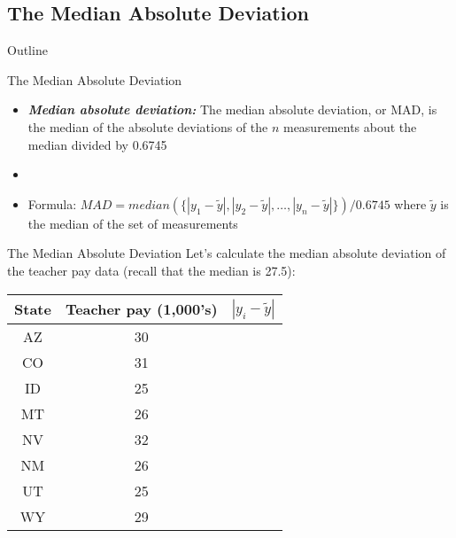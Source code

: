 \documentclass[xcolor=dvipsnames]{beamer}
\begin{document}
\subsection{The Median Absolute Deviation}
\begin{frame}{Outline}
	\tableofcontents[currentsection,subsectionstyle=show/shaded/hide]
\end{frame}

\begin{frame}{The Median Absolute Deviation}
	\begin{itemize}
		\item \textbf{\emph{Median absolute deviation:}} The median absolute deviation, or MAD, is the median of the absolute deviations of the $n$ measurements about the median divided by 0.6745
		\item[]
		\item Formula: $MAD = median(\{|y_1-\tilde{y}|,|y_2 - \tilde{y}|,\hdots,|y_n - \tilde{y}|\}) / 0.6745$
		where $\tilde{y}$ is the median of the set of measurements
	\end{itemize}
\end{frame}

\begin{frame}{The Median Absolute Deviation}
	Let's calculate the median absolute deviation of the teacher pay data (recall that the median is 27.5):
	\begin{center}
		\begin{tabular}{|c|c|c|}
			\hline 
			\textbf{State} & \textbf{Teacher pay (1,000's)} &  $|y_i-\tilde{y}|$ \\ 
			\hline \hline
			AZ & 30 & \\ \hline 
			CO &  31 & \\ \hline 
			ID & 25  & \\  \hline 
			MT &  26 & \\ \hline 
			NV & 32 & \\ \hline 
			NM &  26 & \\ \hline 
			UT &  25 & \\ \hline 
			WY &  29 & \\ \hline 
		\end{tabular} 
	\end{center}
\end{frame}
\end{document}
